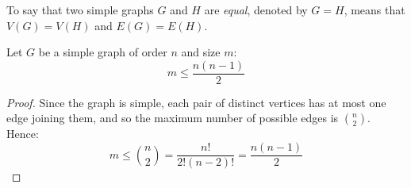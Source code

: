 \documentclass[letterpaper,12pt,fleqn]{article}
\begin{document}
\begin{definition}[Equality]
  To say that two simple graphs \(G\) and \(H\) are \emph{equal}, denoted by \(G=H\), means that \(V(G)=V(H)\) and
  \(E(G)=E(H)\).
\end{definition}

\begin{theorem}
  Let \(G\) be a simple graph of order \(n\) and size \(m\):
  \[ m\le\frac{n(n-1)}{2} \]
\end{theorem}

\begin{proof}
  Since the graph is simple, each pair of distinct vertices has at most one edge joining them, and so the maximum
  number of possible edges is \(\binom{n}{2}\).  Hence:
  \[m\le\binom{n}{2}=\frac{n!}{2!(n-2)!}=\frac{n(n-1)}{2}\]
\end{proof}
\end{document}
